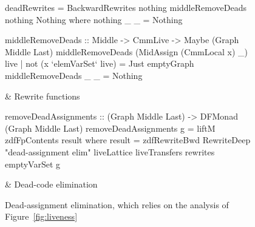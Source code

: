 \documentclass[blockstyle,preprint,nocopyrightspace]{sigplanconf}
\newcommand{\authornote}[1]{{\em #1}}
\def\authornote#1{\unskip\relax}
\newcommand{\john}[1]{\authornote{JD: #1}}
\newcommand\figref[1]{Figure~\ref{fig:#1}}
\newcommand\figlabel[1]{\label{fig:#1}}
\begin{document}



\begin{figure*}
\begin{codetable}
\T\begin{code}
deadRewrites = BackwardRewrites nothing middleRemoveDeads nothing Nothing
  where nothing _ _ = Nothing

middleRemoveDeads :: Middle -> CmmLive -> Maybe (Graph Middle Last)
middleRemoveDeads (MidAssign (CmmLocal x) _) live
    | not (x `elemVarSet` live) = Just emptyGraph
middleRemoveDeads _ _ = Nothing
\end{code}\B
& Rewrite \mbox{functions}\\
\hline

\T\begin{code}
removeDeadAssignments :: (Graph Middle Last) -> DFMonad (Graph Middle Last)
removeDeadAssignments g = liftM zdfFpContents result
     where result = zdfRewriteBwd RewriteDeep "dead-assignment elim"
                                  liveLattice liveTransfers rewrites emptyVarSet g
\end{code}%
& \mbox{Dead-code} elimination\\
\end{codetable}
\caption{Dead-assignment elimination, which relies on the analysis of
\figref{liveness}} 
\figlabel{dead-elim}
\end{figure*}
\end{document}
